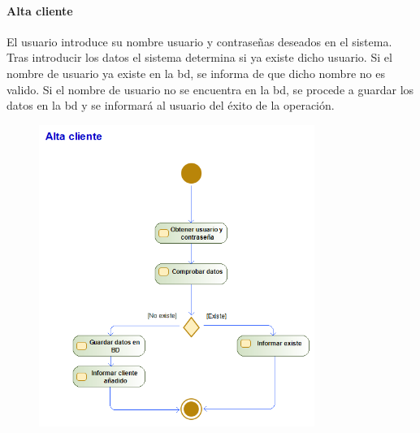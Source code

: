 \paragraph{Alta cliente}
El usuario introduce su nombre usuario y contraseñas deseados en el sistema. Tras introducir los datos el sistema determina si ya existe dicho usuario. Si el nombre de usuario ya existe en la \gls{bd}, se informa de que dicho nombre no es valido. Si el nombre de usuario no se encuentra en la \gls{bd}, se procede a guardar los datos en la \gls{bd} y se informará al usuario del éxito de la operación.
\begin{figure}[H]
    \centering
    \includegraphics[width=0.8\textwidth]{Use_Cases/alta_cliente.png}
\end{figure}
\newpage
